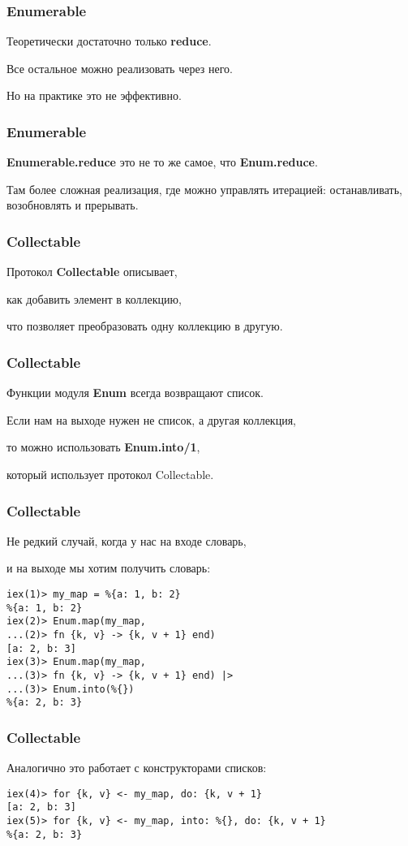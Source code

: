 \documentclass[10pt]{beamer}
\begin{document}
\begin{frame}
  \frametitle{Enumerable}
  Теоретически достаточно только \textbf{reduce}.
  \par \bigskip
  Все остальное можно реализовать через него.
  \par \bigskip
  Но на практике это не эффективно.
\end{frame}

\begin{frame}
  \frametitle{Enumerable}
  \textbf{Enumerable.reduce} это не то же самое, что \textbf{Enum.reduce}.
  \par \bigskip
  Там более сложная реализация, где можно управлять итерацией:
  останавливать, возобновлять и прерывать.
\end{frame}

\begin{frame}
  \frametitle{Collectable}
  Протокол \textbf{Collectable} описывает,
  \par \bigskip
  как добавить элемент в коллекцию,
  \par \bigskip
  что позволяет преобразовать одну коллекцию в другую.
\end{frame}

\begin{frame}
  \frametitle{Collectable}
  Функции модуля \textbf{Enum} всегда возвращают список.
  \par \bigskip
  Если нам на выходе нужен не список, а другая коллекция,
  \par \bigskip
  то можно использовать \textbf{Enum.into/1},
  \par \bigskip
  который использует протокол Collectable.
\end{frame}

\begin{frame}[fragile]
  \frametitle{Collectable}
  Не редкий случай, когда у нас на входе словарь,
  \par \bigskip
  и на выходе мы хотим получить словарь:
  \par \bigskip
  \begin{lstlisting}
iex(1)> my_map = %{a: 1, b: 2}
%{a: 1, b: 2}
iex(2)> Enum.map(my_map,
...(2)> fn {k, v} -> {k, v + 1} end)
[a: 2, b: 3]
iex(3)> Enum.map(my_map,
...(3)> fn {k, v} -> {k, v + 1} end) |>
...(3)> Enum.into(%{})
%{a: 2, b: 3}
  \end{lstlisting}
\end{frame}

\begin{frame}[fragile]
  \frametitle{Collectable}
  Аналогично это работает с конструкторами списков:
  \par \bigskip
  \begin{lstlisting}
iex(4)> for {k, v} <- my_map, do: {k, v + 1}
[a: 2, b: 3]
iex(5)> for {k, v} <- my_map, into: %{}, do: {k, v + 1}
%{a: 2, b: 3}
  \end{lstlisting}
\end{frame}
\end{document}
